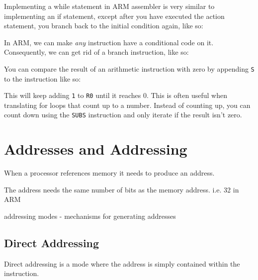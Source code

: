 Implementing a while statement in ARM assembler is very similar to implementing
an if statement, except after you have executed the action statement, you branch
back to the initial condition again, like so:


In ARM, we can make {\it any} instruction have a conditional code on it.
Consequently, we can get rid of a branch instruction, like so:


You can compare the result of an arithmetic instruction with zero by appending
{\tt S} to the instruction like so:


This will keep adding {\tt 1} to {\tt R0} until it reaches 0. This is often
useful when translating for loops that count up to a number. Instead of counting
up, you can count down using the {\tt SUBS} instruction and only iterate if the
result isn't zero.

\section{Addresses and Addressing}
When a processor references memory it needs to produce an address.

The address needs the same number of bits as the memory address. i.e. 32 in ARM

addressing modes - mechanisms for generating addresses

\subsection{Direct Addressing}
Direct addressing is a mode where the address is simply contained within the instruction.

